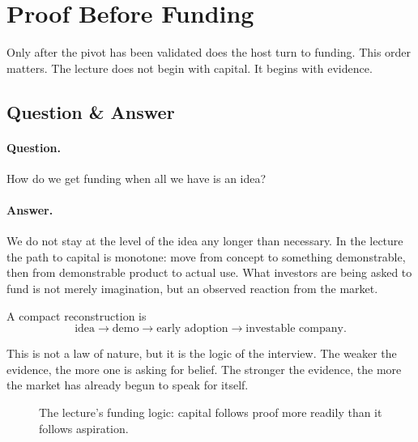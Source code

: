 \section{Proof Before Funding}

Only after the pivot has been validated does the host turn to funding. This order matters. The lecture does not begin with capital. It begins with evidence.

\subsection{Question \& Answer}

\paragraph{Question.} How do we get funding when all we have is an idea?

\paragraph{Answer.} We do not stay at the level of the idea any longer than necessary. In the lecture the path to capital is monotone: move from concept to something demonstrable, then from demonstrable product to actual use. What investors are being asked to fund is not merely imagination, but an observed reaction from the market.

A compact reconstruction is
\begin{equation}
\text{idea}\to \text{demo}\to \text{early adoption}\to \text{investable company}.
\end{equation}

This is not a law of nature, but it is the logic of the interview. The weaker the evidence, the more one is asking for belief. The stronger the evidence, the more the market has already begun to speak for itself.

\begin{figure}[h]
\centering
{}
\caption{The lecture's funding logic: capital follows proof more readily than it follows aspiration.}
\end{figure}

